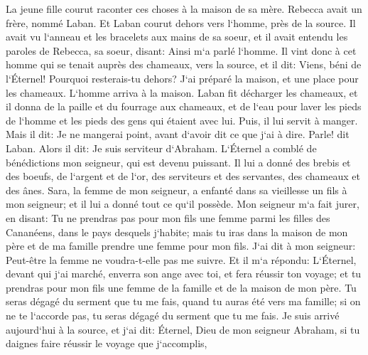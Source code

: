 \verse La jeune fille courut raconter ces choses à la maison de sa mère. 
\verse Rebecca avait un frère, nommé Laban. Et Laban courut dehors vers l`homme, près de la source. 
\verse Il avait vu l`anneau et les bracelets aux mains de sa soeur, et il avait entendu les paroles de Rebecca, sa soeur, disant: Ainsi m`a parlé l`homme. Il vint donc à cet homme qui se tenait auprès des chameaux, vers la source, 
\verse et il dit: Viens, béni de l`Éternel! Pourquoi resterais-tu dehors? J`ai préparé la maison, et une place pour les chameaux. 
\verse L`homme arriva à la maison. Laban fit décharger les chameaux, et il donna de la paille et du fourrage aux chameaux, et de l`eau pour laver les pieds de l`homme et les pieds des gens qui étaient avec lui. 
\verse Puis, il lui servit à manger. Mais il dit: Je ne mangerai point, avant d`avoir dit ce que j`ai à dire. Parle! dit Laban. 
\verse Alors il dit: Je suis serviteur d`Abraham. 
\verse L`Éternel a comblé de bénédictions mon seigneur, qui est devenu puissant. Il lui a donné des brebis et des boeufs, de l`argent et de l`or, des serviteurs et des servantes, des chameaux et des ânes. 
\verse Sara, la femme de mon seigneur, a enfanté dans sa vieillesse un fils à mon seigneur; et il lui a donné tout ce qu`il possède. 
\verse Mon seigneur m`a fait jurer, en disant: Tu ne prendras pas pour mon fils une femme parmi les filles des Cananéens, dans le pays desquels j`habite; 
\verse mais tu iras dans la maison de mon père et de ma famille prendre une femme pour mon fils. 
\verse J`ai dit à mon seigneur: Peut-être la femme ne voudra-t-elle pas me suivre. 
\verse Et il m`a répondu: L`Éternel, devant qui j`ai marché, enverra son ange avec toi, et fera réussir ton voyage; et tu prendras pour mon fils une femme de la famille et de la maison de mon père. 
\verse Tu seras dégagé du serment que tu me fais, quand tu auras été vers ma famille; si on ne te l`accorde pas, tu seras dégagé du serment que tu me fais. 
\verse Je suis arrivé aujourd`hui à la source, et j`ai dit: Éternel, Dieu de mon seigneur Abraham, si tu daignes faire réussir le voyage que j`accomplis, 
